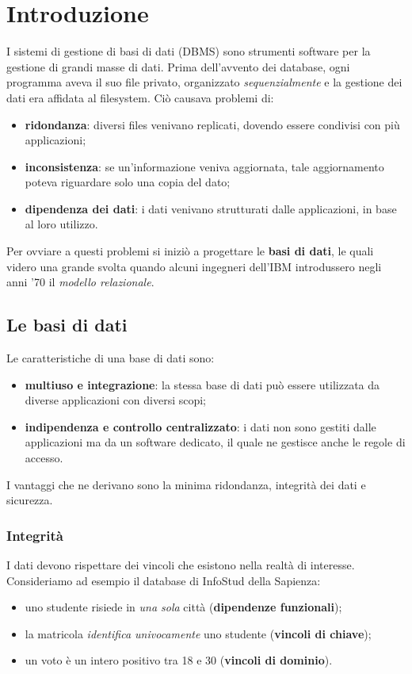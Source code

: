 \section{Introduzione}
I sistemi di gestione di basi di dati (DBMS) sono strumenti software per la gestione
di grandi masse di dati. Prima dell'avvento dei database, ogni programma aveva il suo
file privato, organizzato \emph{sequenzialmente} e la gestione dei dati era affidata
al filesystem. Ci\`o causava problemi di:

\begin{itemize}
 \item \textbf{ridondanza}: diversi files venivano replicati, dovendo essere condivisi
 con pi\`u applicazioni;
 \item \textbf{inconsistenza}: se un'informazione veniva aggiornata, tale aggiornamento 
 poteva riguardare solo una copia del dato;
 \item \textbf{dipendenza dei dati}: i dati venivano strutturati dalle applicazioni, in
 base al loro utilizzo.
\end{itemize}

Per ovviare a questi problemi si inizi\`o a progettare le \textbf{basi di dati}, le quali
videro una grande svolta quando alcuni ingegneri dell'IBM introdussero negli anni '70 il
\emph{modello relazionale}.

  \subsection{Le basi di dati}
  Le caratteristiche di una base di dati sono:
  \begin{itemize}
   \item \textbf{multiuso e integrazione}: la stessa base di dati pu\`o essere utilizzata 
   da diverse applicazioni con diversi scopi;
   \item \textbf{indipendenza e controllo centralizzato}: i dati non sono gestiti dalle
   applicazioni ma da un software dedicato, il quale ne gestisce anche le regole di 
   accesso.
  \end{itemize}
 I vantaggi che ne derivano sono la minima ridondanza, integrità dei dati e sicurezza.
 
 \subsubsection{Integrità}
 I dati devono rispettare dei vincoli che esistono nella realtà di interesse. Consideriamo
 ad esempio il database di InfoStud della Sapienza:
 \begin{itemize}
  \item uno studente risiede in \emph{una sola} città (\textbf{dipendenze funzionali});
  \item la matricola \emph{identifica univocamente} uno studente (\textbf{vincoli di chiave});
  \item un voto è un intero positivo tra 18 e 30 (\textbf{vincoli di dominio}). 
 \end{itemize}
 
